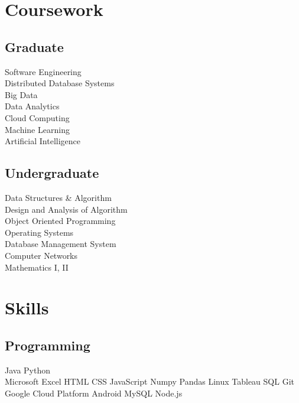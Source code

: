 \documentclass[]{deedy-resume-openfont}
\begin{document}
\begin{minipage}[t]{0.33\textwidth}

\section{Coursework}
\subsection{Graduate}
Software Engineering \\
Distributed Database Systems \\
Big Data \\
Data Analytics \\
Cloud Computing \\
Machine Learning \\
Artificial Intelligence \\
\sectionsep

\subsection{Undergraduate}
Data Structures \& Algorithm \\
Design and Analysis of Algorithm \\
Object Oriented Programming \\
Operating Systems \\
Database Management System \\
Computer Networks \\
Mathematics  I, II  \\


\section{Skills}
\subsection{Programming}
Java \textbullet{} Python  \\
Microsoft Excel \textbullet{} HTML \textbullet{} CSS \textbullet{} JavaScript \textbullet{} Numpy \textbullet{} Pandas \textbullet{} Linux \textbullet{} Tableau \textbullet{}  SQL \textbullet{} Git \\
Google Cloud Platform  \textbullet{} Android \textbullet{} MySQL \textbullet{}  Node.js 
\sectionsep

%
%

\end{minipage} 
\end{document}
